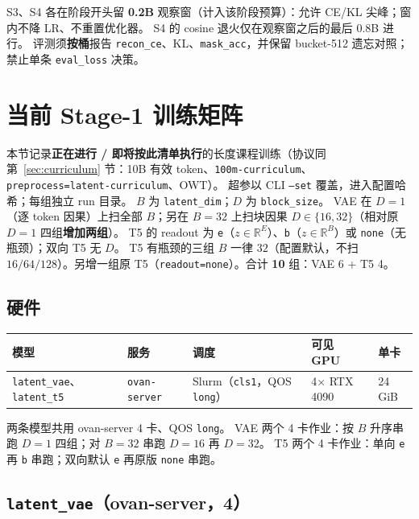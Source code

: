 \documentclass[UTF8,a4paper,11pt]{ctexart}
\begin{document}
S3、S4 各在阶段开头留 \textbf{0.2B} 观察窗（计入该阶段预算）：允许 CE/KL 尖峰；窗内不降 LR、不重置优化器。
S4 的 cosine 退火仅在观察窗之后的最后 0.8B 进行。
评测须\textbf{按桶}报告 \texttt{recon\_ce}、KL、\texttt{mask\_acc}，并保留 bucket-512 遗忘对照；禁止单条 \texttt{eval\_loss} 决策。

\section{当前 Stage-1 训练矩阵}
\label{sec:runs}

本节记录\textbf{正在进行 / 即将按此清单执行}的长度课程训练（协议同第~\ref{sec:curriculum} 节：10B 有效 token、\texttt{100m-curriculum}、\texttt{preprocess=latent-curriculum}、OWT）。
超参以 CLI \texttt{--set} 覆盖，进入配置哈希；每组独立 run 目录。
$B$ 为 \texttt{latent\_dim}；$D$ 为 \texttt{block\_size}。
VAE 在 $D{=}1$（逐 token 因果）上扫全部 $B$；另在 $B{=}32$ 上扫块因果 $D{\in}\{16,32\}$（相对原 $D{=}1$ 四组\textbf{增加两组}）。
T5 的 readout 为 \texttt{e}（$z\in\mathbb{R}^{E}$）、\texttt{b}（$z\in\mathbb{R}^{B}$）或 \texttt{none}（无瓶颈）；双向 T5 无 $D$。
T5 有瓶颈的三组 $B$ 一律 $32$（配置默认，不扫 $16/64/128$）。另增一组原 T5（\texttt{readout=none}）。合计 \textbf{10} 组：VAE 6 + T5 4。

\subsection{硬件}

\begin{center}
\small
\begin{tabular}{lllll}
\toprule
模型 & 服务 & 调度 & 可见 GPU & 单卡 \\
\midrule
\texttt{latent\_vae}、\texttt{latent\_t5} & \texttt{ovan-server} & Slurm（\texttt{cls1}，QOS \texttt{long}） & 4$\times$ RTX 4090 & 24\,GiB \\
\bottomrule
\end{tabular}
\end{center}

两条模型共用 ovan-server 4 卡、QOS \texttt{long}。
VAE 两个 4 卡作业：按 $B$ 升序串跑 $D{=}1$ 四组；对 $B{=}32$ 串跑 $D{=}16$ 再 $D{=}32$。
T5 两个 4 卡作业：单向 \texttt{e} 再 \texttt{b} 串跑；双向默认 \texttt{e} 再原版 \texttt{none} 串跑。

\subsection{\texttt{latent\_vae}（ovan-server，4）}
\end{document}
